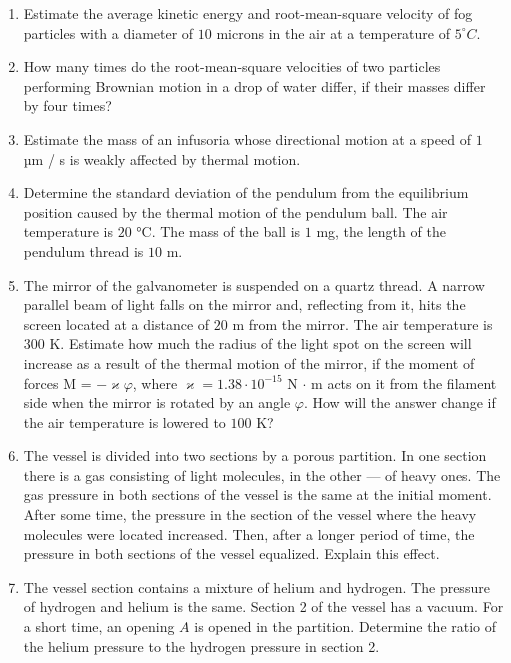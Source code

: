 \documentclass{article}
\begin{document}
\begin{enumerate}[label=5.1.\arabic*]

\item Estimate the average kinetic energy and root-mean-square velocity of fog particles with a diameter of $10$ microns in the air at a temperature of $5^\circ C$.

\item How many times do the root-mean-square velocities of two particles performing Brownian motion in a drop of water differ, if their masses differ by four times?

\item Estimate the mass of an infusoria whose directional motion at a speed of $1$ µm / s is weakly affected by thermal motion.

\item Determine the standard deviation of the pendulum from the equilibrium position caused by the thermal motion of the pendulum ball. The air temperature is $20$ °C. The mass of the ball is $1$ mg, the length of the pendulum thread is $10$ m.

\item The mirror of the galvanometer is suspended on a quartz thread. A narrow parallel beam of light falls on the mirror and, reflecting from it, hits the screen located at a distance of $20$ m from the mirror. The air temperature is $300$ K. Estimate how much the radius of the light spot on the screen will increase as a result of the thermal motion of the mirror, if the moment of forces M = $ - \varkappa \varphi$, where $\varkappa = 1.38 \cdot 10^{-15}$ N $\cdot$ m acts on it from the filament side when the mirror is rotated by an angle $\varphi$. How will the answer change if the air temperature is lowered to $100$ K?

\item The vessel is divided into two sections by a porous partition. In one section there is a gas consisting of light molecules, in the other — of heavy ones. The gas pressure in both sections of the vessel is the same at the initial moment. After some time, the pressure in the section of the vessel where the heavy molecules were located increased. Then, after a longer period of time, the pressure in both sections of the vessel equalized. Explain this effect.

\item The vessel section contains a mixture of helium and hydrogen. The pressure of hydrogen and helium is the same. Section 2 of the vessel has a vacuum. For a short time, an opening $A$ is opened in the partition. Determine the ratio of the helium pressure to the hydrogen pressure in section 2.


\end{enumerate}
\end{document}
